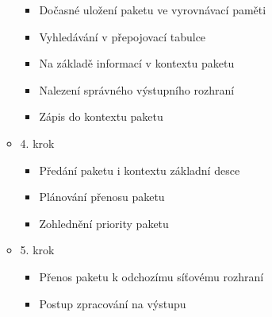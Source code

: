 \begin{itemize}
\begin{itemize}
\begin{itemize}
\item Dočasné uložení paketu ve vyrovnávací paměti
\item Vyhledávání v přepojovací tabulce
\item Na základě informací v kontextu paketu
\item Nalezení správného výstupního rozhraní
\item Zápis do kontextu paketu
\end{itemize}
\item 4. krok
\begin{itemize}
\item Předání paketu i kontextu základní desce
\item Plánování přenosu paketu
\item Zohlednění priority paketu
\end{itemize}
\item 5. krok
\begin{itemize}
\item Přenos paketu k odchozímu síťovému rozhraní
\item Postup zpracování na výstupu
\end{itemize}
\end{itemize}



\end{itemize}
